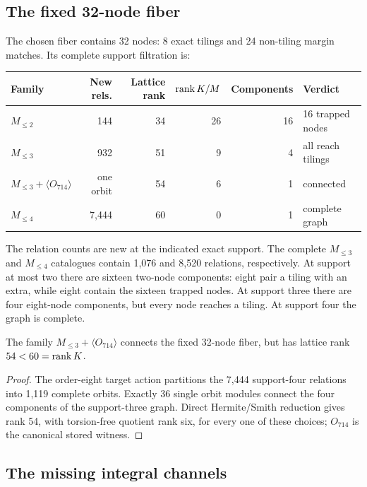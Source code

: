 \subsection{The fixed 32-node fiber}

The chosen fiber contains 32 nodes: 8 exact tilings and 24 non-tiling margin
matches.  Its complete support filtration is:

\begin{center}
\small
\begin{tabular}{@{}lrrrrl@{}}
\toprule
Family & New rels. & Lattice rank & \(\operatorname{rank} K/M\) & Components & Verdict\\
\midrule
\(M_{\leq2}\) & 144 & 34 & 26 & 16 & 16 trapped nodes\\
\(M_{\leq3}\) & 932 & 51 & 9 & 4 & all reach tilings\\
\(M_{\leq3}+\langle O_{714}\rangle\) & one orbit & 54 & 6 & 1 & connected\\
\(M_{\leq4}\) & 7,444 & 60 & 0 & 1 & complete graph\\
\bottomrule
\end{tabular}
\end{center}

The relation counts are new at the indicated exact support.  The complete
\(M_{\leq3}\) and \(M_{\leq4}\) catalogues contain 1,076 and 8,520 relations,
respectively.  At support at most two there are sixteen two-node components:
eight pair a tiling with an extra, while eight contain the sixteen trapped
nodes.  At support three there are four eight-node components, but every node
reaches a tiling.  At support four the graph is complete.

\begin{proposition}
\label{prop:p21-one}
The family \(M_{\leq3}+\langle O_{714}\rangle\) connects the fixed 32-node
fiber, but has lattice rank \(54<60=\operatorname{rank} K\).
\end{proposition}

\begin{proof}
The order-eight target action partitions the 7,444 support-four relations
into 1,119 complete orbits.  Exactly 36 single orbit modules connect the four
components of the support-three graph.  Direct Hermite/Smith reduction gives
rank 54, with torsion-free quotient rank six, for every one of these choices;
\(O_{714}\) is the canonical stored witness.
\end{proof}

\subsection{The missing integral channels}

